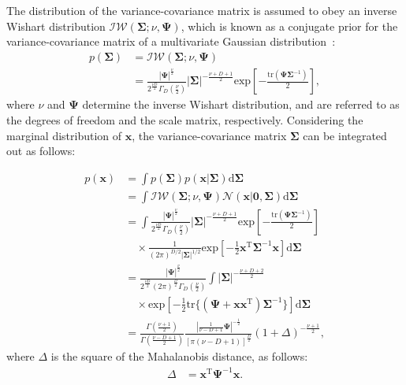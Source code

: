 \documentclass[journal]{IEEEtran}
\begin{document}
The distribution of the variance-covariance matrix is assumed to obey an inverse Wishart distribution ${\mathcal {IW}}(\mathbf{\Sigma}; \nu, \mathbf{\Psi})$, which is known as a conjugate prior for the variance-covariance matrix of a multivariate Gaussian distribution~\cite{t2006}:
%
\begin{align}
	p(\mathbf{\Sigma}) &= {\mathcal {IW}}(\mathbf{\Sigma};\nu,\mathbf{\Psi}) \nonumber\\
&= \frac{|\mathbf{\Psi}|^{\frac{\nu}{2}}}{2^{\frac{\nu D}{2}} \Gamma_D \left(\frac{\nu}{2}\right)} |\mathbf{\Sigma}|^{-\frac{\nu+D+1}{2}} \mathrm{exp} \left[-\frac{\mathrm{tr}(\mathbf{\Psi} \mathbf{\Sigma}^{-1})}{2}\right],\label{eq:p_sigma} %
\end{align}
%
where $\nu$ and $\mathbf{\Psi}$ determine the inverse Wishart distribution, and are referred to as the degrees of freedom and the scale matrix, respectively.
Considering the marginal distribution of $\mathbf{x}$, the variance-covariance matrix $\mathbf{\Sigma}$ can be integrated out as follows:

\begin{align}
	p(\mathbf{x}) &= \int p(\mathbf{\Sigma})p(\mathbf{x}|\mathbf{\Sigma}) \mathrm{d}{\mathbf{\Sigma}} \nonumber \\
		&= \int {\mathcal {IW}}(\mathbf{\Sigma}; \nu, {\mathbf{\Psi}}) {\mathcal N}(\mathbf{x}|\mathbf{0}, \mathbf{\Sigma}) \mathrm{d}{\mathbf{\Sigma}} \label{eq:marginal_x} \\ %
		&= \int \frac{|{\mathbf{\Psi}}|^{\frac{\nu}{2}}}{2^{\frac{\nu D}{2}} \Gamma_D \left(\frac{\nu}{2}\right)} |\mathbf{\Sigma}|^{-\frac{\nu+D+1}{2}}\mathrm{exp} \left[-\frac{\mathrm{tr}(\mathbf{\Psi} \mathbf{\Sigma}^{-1})}{2}\right] \nonumber \\
&\quad \times\frac{1}{(2\pi)^{D/2} |\mathbf{\Sigma}|^{1/2}} \mathrm{exp} \left[-\frac{1}{2}\mathbf{x}^\mathrm{T} {\mathbf{\Sigma}}^{-1} \mathbf{x}\right] \mathrm{d}{\mathbf{\Sigma}} \nonumber \\
		&= \frac{|{\mathbf{\Psi}}|^{\frac{\nu}{2}}}{2^{\frac{\nu D}{2}} (2\pi)^\frac{D}{2} \Gamma_D \left(\frac{\nu}{2}\right)} \int |\mathbf{\Sigma}|^{-\frac{\nu+D+2}{2}}\nonumber\\
&\quad \times \mathrm{exp} \left[-\frac{1}{2}\mathrm{tr}\{(\mathbf{\Psi} + \mathbf{x} \mathbf{x}^\mathrm{T})\mathbf{\Sigma}^{-1}\}\right] \mathrm{d}{\mathbf{\Sigma}} \nonumber \\
\label{eq:p_x}
&= \frac{\Gamma(\frac{\nu+1}{2})}{\Gamma(\frac{\nu-D+1}{2})} \frac{|\frac{1}{\nu-D+1} {\mathbf{\Psi}}|^{-\frac{1}{2}}}{\left[\pi(\nu-D+1) \right]^{\frac{D}{2}}} (1+\Delta)^{-\frac{\nu+1}{2}} ,%
\end{align}
%
where $\Delta$ is the square of the Mahalanobis distance, as follows:
%
\begin{align}
	\Delta &= \mathbf{x}^\mathrm{T}{\mathbf{\Psi}}^{-1}\mathbf{x}.
\end{align}
%
\end{document}

